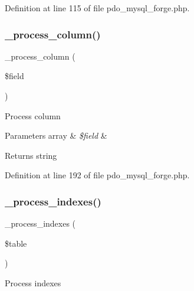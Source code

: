 Definition at line 115 of file pdo\+\_\+mysql\+\_\+forge.\+php.

\mbox{\label{class_c_i___d_b__pdo__mysql__forge_a8f38f1c5b5dddecca4befbe393f3f299}} 
\subsubsection{\texorpdfstring{\_process\_column()}{\_process\_column()}}
{\footnotesize\ttfamily \+\_\+process\+\_\+column (\begin{DoxyParamCaption}\item[{}]{\$field }\end{DoxyParamCaption})\hspace{0.3cm}{\ttfamily [protected]}}

Process column


\begin{DoxyParams}[1]{Parameters}
array & {\em \$field} & \\
\hline
\end{DoxyParams}
\begin{DoxyReturn}{Returns}
string 
\end{DoxyReturn}


Definition at line 192 of file pdo\+\_\+mysql\+\_\+forge.\+php.

\mbox{\label{class_c_i___d_b__pdo__mysql__forge_ae0bdb4ea3418590d1894c5b621b5ca50}} 
\subsubsection{\texorpdfstring{\_process\_indexes()}{\_process\_indexes()}}
{\footnotesize\ttfamily \+\_\+process\+\_\+indexes (\begin{DoxyParamCaption}\item[{}]{\$table }\end{DoxyParamCaption})\hspace{0.3cm}{\ttfamily [protected]}}

Process indexes


